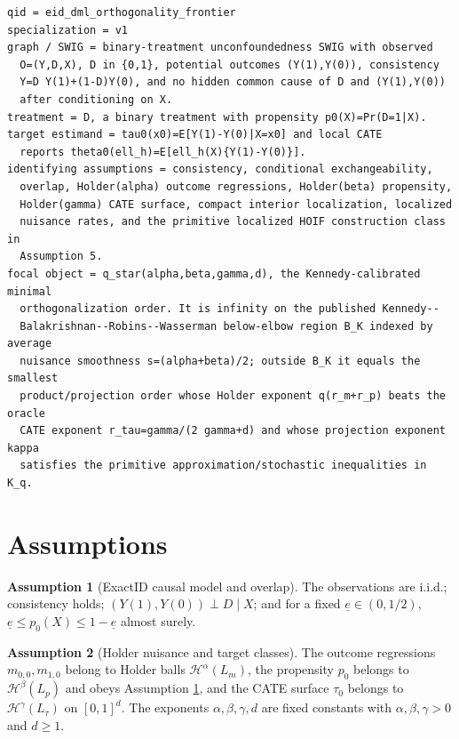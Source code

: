 \documentclass[11pt]{article}
\theoremstyle{definition}
\newtheorem{assumption}{Assumption}
\theoremstyle{plain}
\theoremstyle{remark}
\begin{document}
\begin{verbatim}
qid = eid_dml_orthogonality_frontier
specialization = v1
graph / SWIG = binary-treatment unconfoundedness SWIG with observed
  O=(Y,D,X), D in {0,1}, potential outcomes (Y(1),Y(0)), consistency
  Y=D Y(1)+(1-D)Y(0), and no hidden common cause of D and (Y(1),Y(0))
  after conditioning on X.
treatment = D, a binary treatment with propensity p0(X)=Pr(D=1|X).
target estimand = tau0(x0)=E[Y(1)-Y(0)|X=x0] and local CATE
  reports theta0(ell_h)=E[ell_h(X){Y(1)-Y(0)}].
identifying assumptions = consistency, conditional exchangeability,
  overlap, Holder(alpha) outcome regressions, Holder(beta) propensity,
  Holder(gamma) CATE surface, compact interior localization, localized
  nuisance rates, and the primitive localized HOIF construction class in
  Assumption 5.
focal object = q_star(alpha,beta,gamma,d), the Kennedy-calibrated minimal
  orthogonalization order. It is infinity on the published Kennedy--
  Balakrishnan--Robins--Wasserman below-elbow region B_K indexed by average
  nuisance smoothness s=(alpha+beta)/2; outside B_K it equals the smallest
  product/projection order whose Holder exponent q(r_m+r_p) beats the oracle
  CATE exponent r_tau=gamma/(2 gamma+d) and whose projection exponent kappa
  satisfies the primitive approximation/stochastic inequalities in K_q.
\end{verbatim}

\section{Assumptions}
\begin{assumption}[ExactID causal model and overlap]\label{ass:causal}
The observations are i.i.d.; consistency holds; \((Y(1),Y(0))\perp D\mid X\);
and for a fixed \(\underline e\in(0,1/2)\),
\(\underline e\le p_0(X)\le 1-\underline e\) almost surely.
\end{assumption}

\begin{assumption}[Holder nuisance and target classes]\label{ass:holder}
The outcome regressions \(m_{0,0},m_{1,0}\) belong to Holder balls
\(\mathcal H^\alpha(L_m)\), the propensity \(p_0\) belongs to
\(\mathcal H^\beta(L_p)\) and obeys Assumption \ref{ass:causal}, and the CATE
surface \(\tau_0\) belongs to \(\mathcal H^\gamma(L_\tau)\) on \([0,1]^d\).
The exponents \(\alpha,\beta,\gamma,d\) are fixed constants with
\(\alpha,\beta,\gamma>0\) and \(d\ge1\).
\end{assumption}
\end{document}
